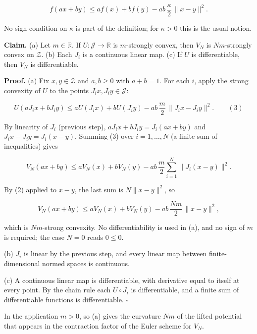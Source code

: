 \documentclass[11pt,a4paper]{report}
\begin{document}
\[f(ax+by)\le af(x)+bf(y)-ab\,\frac\kappa2\,\|x-y\|^2 .\]


No sign condition on \(\kappa\) is part of the definition; for \(\kappa>0\) this is the usual notion.




\textbf{Claim.} (a) Let \(m\in\mathbb R\). If \(U:\mathcal J\to\mathbb R\) is \(m\)-strongly convex, then \(V_N\) is \(Nm\)-strongly convex on \(\mathcal Z\). (b) Each \(J_i\) is a continuous linear map. (c) If \(U\) is differentiable, then \(V_N\) is differentiable.




\textbf{Proof.} (a) Fix \(x,y\in\mathcal Z\) and \(a,b\ge0\) with \(a+b=1\). For each \(i\), apply the strong convexity of \(U\) to the points \(J_ix,J_iy\in\mathcal J\):


\[U(aJ_ix+bJ_iy)\le aU(J_ix)+bU(J_iy)-ab\,\frac m2\,\|J_ix-J_iy\|^2 .\qquad(3)\]


By linearity of \(J_i\) (previous step), \(aJ_ix+bJ_iy=J_i(ax+by)\) and \(J_ix-J_iy=J_i(x-y)\). Summing (3) over \(i=1,\dots,N\) (a finite sum of inequalities) gives


\[V_N(ax+by)\le aV_N(x)+bV_N(y)-ab\,\frac m2\sum_{i=1}^N\|J_i(x-y)\|^2 .\]


By (2) applied to \(x-y\), the last sum is \(N\|x-y\|^2\), so


\[V_N(ax+by)\le aV_N(x)+bV_N(y)-ab\,\frac{Nm}2\,\|x-y\|^2,\]


which is \(Nm\)-strong convexity. No differentiability is used in (a), and no sign of \(m\) is required; the case \(N=0\) reads \(0\le0\).




(b) \(J_i\) is linear by the previous step, and every linear map between finite-dimensional normed spaces is continuous.




(c) A continuous linear map is differentiable, with derivative equal to itself at every point. By the chain rule each \(U\circ J_i\) is differentiable, and a finite sum of differentiable functions is differentiable. \(\square\)




In the application \(m>0\), so (a) gives the curvature \(Nm\) of the lifted potential that appears in the contraction factor of the Euler scheme for \(V_N\).
\end{document}
